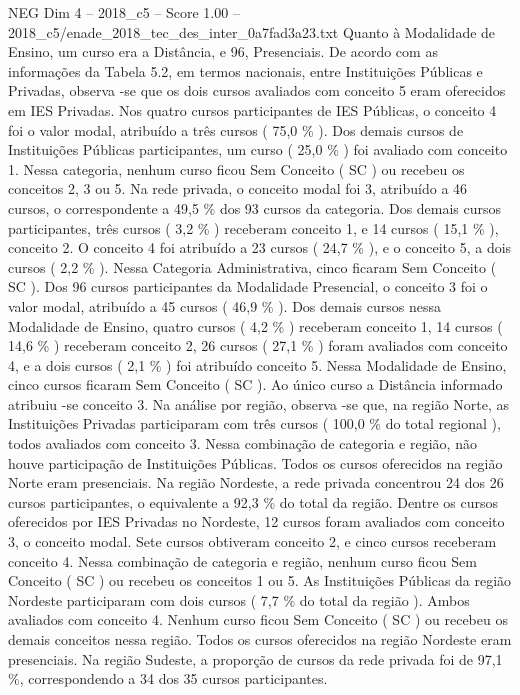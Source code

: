 \begin{textsample}{NEG Dim 4 – 2018\_c5 – Score 1.00 – 2018\_c5/enade\_2018\_tec\_des\_inter\_0a7fad3a23.txt}
Quanto à Modalidade de Ensino, um curso era a Distância, e 96, Presenciais.
De acordo com as informações da Tabela 5.2, em termos nacionais, entre Instituições Públicas e Privadas, observa -se que os dois cursos avaliados com conceito 5 eram oferecidos em IES Privadas.
Nos quatro cursos participantes de IES Públicas, o conceito 4 foi o valor modal, atribuído a três cursos ( 75,0 \% ).
Dos demais cursos de Instituições Públicas participantes, um curso ( 25,0 \% ) foi avaliado com conceito 1.
Nessa categoria, nenhum curso ficou Sem Conceito ( SC ) ou recebeu os conceitos 2, 3 ou 5.
Na rede privada, o conceito modal foi 3, atribuído a 46 cursos, o correspondente a 49,5 \% dos 93 cursos da categoria.
Dos demais cursos participantes, três cursos ( 3,2 \% ) receberam conceito 1, e 14 cursos ( 15,1 \% ), conceito 2.
O conceito 4 foi atribuído a 23 cursos ( 24,7 \% ), e o conceito 5, a dois cursos ( 2,2 \% ).
Nessa Categoria Administrativa, cinco ficaram Sem Conceito ( SC ).
Dos 96 cursos participantes da Modalidade Presencial, o conceito 3 foi o valor modal, atribuído a 45 cursos ( 46,9 \% ).
Dos demais cursos nessa Modalidade de Ensino, quatro cursos ( 4,2 \% ) receberam conceito 1, 14 cursos ( 14,6 \% ) receberam conceito 2, 26 cursos ( 27,1 \% ) foram avaliados com conceito 4, e a dois cursos ( 2,1 \% ) foi atribuído conceito 5.
Nessa Modalidade de Ensino, cinco cursos ficaram Sem Conceito ( SC ).
Ao único curso a Distância informado atribuiu -se conceito 3.
Na análise por região, observa -se que, na região Norte, as Instituições Privadas participaram com três cursos ( 100,0 \% do total regional ), todos avaliados com conceito 3.
Nessa combinação de categoria e região, não houve participação de Instituições Públicas.
Todos os cursos oferecidos na região Norte eram presenciais.
Na região Nordeste, a rede privada concentrou 24 dos 26 cursos participantes, o equivalente a 92,3 \% do total da região.
Dentre os cursos oferecidos por IES Privadas no Nordeste, 12 cursos foram avaliados com conceito 3, o conceito modal.
Sete cursos obtiveram conceito 2, e cinco cursos receberam conceito 4.
Nessa combinação de categoria e região, nenhum curso ficou Sem Conceito ( SC ) ou recebeu os conceitos 1 ou 5.
As Instituições Públicas da região Nordeste participaram com dois cursos ( 7,7 \% do total da região ).
Ambos avaliados com conceito 4.
Nenhum curso ficou Sem Conceito ( SC ) ou recebeu os demais conceitos nessa região.
Todos os cursos oferecidos na região Nordeste eram presenciais.
Na região Sudeste, a proporção de cursos da rede privada foi de 97,1 \%, correspondendo a 34 dos 35 cursos participantes.

\end{textsample}
